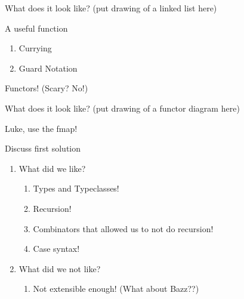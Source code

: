 \documentclass{beamer}
\begin{document}

\begin{frame}{What does it look like?}
  \exampleLists
  (put drawing of a linked list here)
\end{frame}

\begin{frame}{A useful function}
  \rangeDef
  \begin{enumerate}
    \pause
    \item Currying
    \pause
    \item Guard Notation
  \end{enumerate}
\end{frame}

\begin{frame}{Functors! (Scary? No!)}
\introFunctors
\end{frame}

\begin{frame}{What does it look like?}
  (put drawing of a functor diagram here)
\end{frame}

\begin{frame}{Luke, use the fmap!}
\firstSolution  
\end{frame}

\begin{frame}{Discuss first solution}
  \begin{enumerate}
    \item What did we like?
      \begin{enumerate}
        \pause
        \item Types and Typeclasses!
        \pause
        \item Recursion!
        \pause
        \item Combinators that allowed us to not do recursion!
        \pause
        \item Case syntax!
      \end{enumerate}
    \pause
    \item What did we not like?
      \begin{enumerate}
        \pause
        \item Not extensible enough! (What about Bazz??)
      \end{enumerate}
  \end{enumerate}
\end{frame}
\end{document}
